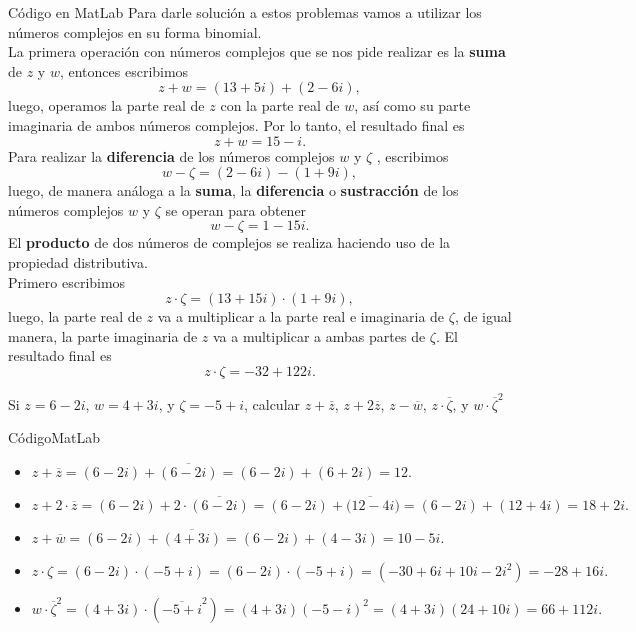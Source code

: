\documentclass[twoside]{book}
\begin{document}
\begin{sol}
    \begin{solucion}{C\'odigo en MatLab}
        Para darle soluci\'on a estos problemas vamos a utilizar los n\'umeros complejos en su forma binomial.\\
        La primera operaci\'on con n\'umeros complejos que se nos pide realizar es la \textbf{suma} de $z$ y $w$, entonces escribimos
        $$z+w = (13 + 5i) + (2- 6i),$$ luego, operamos la parte real  de $z$ con la parte  real de $w$, as\'i como su parte imaginaria de ambos n\'umeros complejos. Por lo tanto, el resultado final es
        $$z + w = 15-i.$$
        Para realizar la \textbf{diferencia} de los n\'umeros complejos $w$ y $\zeta$ , escribimos
        $$ w - \zeta = (2-6i) - (1 + 9i),$$
        luego, de manera an\'aloga a la \textbf{suma}, la \textbf{diferencia} o \textbf{sustracci\'on} de los n\'umeros  complejos $w$ y $\zeta$ se operan para obtener
        $$w - \zeta = 1- 15i. $$
        El \textbf{producto} de dos n\'umeros de complejos se realiza haciendo uso de la propiedad distributiva.\\ Primero escribimos
        $$z \cdot \zeta = (13 + 15i)\cdot(1 + 9i),$$
        luego, la parte real de $z$ va a multiplicar a la parte real e imaginaria de $\zeta$, de igual manera, la parte imaginaria de $z$ va a multiplicar a ambas partes de $\zeta$. El resultado final es
        $$z\cdot\zeta=-32+ 122i.$$
    \end{solucion}
\end{sol}
\begin{example}{}
    Si $z=6-2i$, $w=4+3i$, y $\zeta=-5+i$, calcular $z+\overline{z}$,  $z+2\overline{z}$, $z-\overline{w}$, $z\cdot\overline{\zeta}$, y $w \cdot \overline{\zeta}^2 $
\end{example}
\begin{sol}
    \begin{solucion}{C\'odigoMatLab}
        \begin{itemize}
            \item $z+\overline{z}=(6-2i)+\overline{(6-2i)}=(6-2i)+(6+2i)= 12.$
            \item $z+ 2\cdot \overline{z}=(6-2i)+2\cdot \overline{(6-2i)}=(6-2i)+\overline{(12-4i})= (6-2i)+(12+4i)= 18 +2i.$
            \item $z+\overline{w}=(6-2i)+\overline{(4+3i)}=(6-2i)+(4-3i)=10-5i.$
            \item $z\cdot \zeta= (6-2i)\cdot (-5+i)= (6-2i)\cdot(-5+i)=(-30+6i+10i-2i^2)=-28+16i.$
            \item $w\cdot \overline{\zeta}^2= (4+3i)\cdot(\overline{-5+i}^2)=(4+3i)(-5-i)^2=(4+3i)(24+10i)=66+112i.$
        \end{itemize}

    \end{solucion}
\end{sol}%
\end{document}
